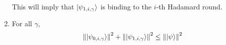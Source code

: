 \begin{lemma}
\begin{enumerate}
			This will imply that $\ket{\psi_{1,i,\gamma}}$ is binding to the $i$-th Hadamard round.

		\item \label{property-partition-norm-sum}
			For all $\gamma$,
			\begin{align}
				\left\lVert\ket{\psi_{0,i,\gamma}}\right\rVert^2+ \left\lVert\ket{\psi_{1,i,\gamma}}\right\rVert^2 \leq  \left\lVert\ket{\psi}\right\rVert^2
			\end{align}
	\end{enumerate}
\end{lemma}

